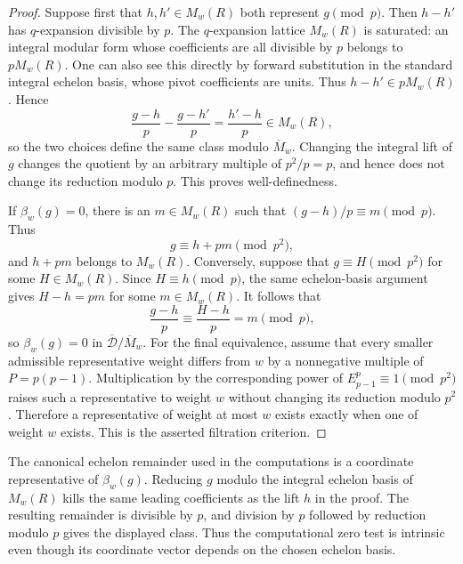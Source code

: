 \begin{proof}
Suppose first that $h,h'\in M_w(R)$ both represent $g\pmod p$.  Then
$h-h'$ has $q$-expansion divisible by $p$.  The $q$-expansion lattice
$M_w(R)$ is saturated: an integral modular form whose coefficients are all
divisible by $p$ belongs to $pM_w(R)$.  One can also see this directly by
forward substitution in the standard integral echelon basis, whose pivot
coefficients are units.  Thus $h-h'\in pM_w(R)$.  Hence
\[
  \frac{g-h}{p}-\frac{g-h'}{p}=\frac{h'-h}{p}\in M_w(R),
\]
so the two choices define the same class modulo $\overline M_w$.  Changing
the integral lift of $g$ changes the quotient by an arbitrary multiple of
$p^2/p=p$, and hence does not change its reduction modulo $p$.  This proves
well-definedness.

If $\beta_w(g)=0$, there is an $m\in M_w(R)$ such that
$(g-h)/p\equiv m\pmod p$.  Thus
\[
  g\equiv h+pm\pmod{p^2},
\]
and $h+pm$ belongs to $M_w(R)$.  Conversely, suppose that
$g\equiv H\pmod{p^2}$ for some $H\in M_w(R)$.  Since
$H\equiv h\pmod p$, the same echelon-basis argument gives
$H-h=pm$ for some $m\in M_w(R)$.  It follows that
\[
  \frac{g-h}{p}\equiv\frac{H-h}{p}=m\pmod p,
\]
so $\beta_w(g)=0$ in
$\overline{\mathcal D}/\overline M_w$.  For the final equivalence, assume
that every smaller admissible representative weight differs from $w$ by a
nonnegative multiple of $P=p(p-1)$.  Multiplication by the corresponding
power of $E_{p-1}^p\equiv1\pmod {p^2}$ raises such a representative to
weight $w$ without changing its reduction modulo $p^2$.  Therefore a
representative of weight at most $w$ exists exactly when one of weight $w$
exists.  This is the asserted filtration criterion.
\end{proof}

\begin{remark}\label{rem:bockstein-computation}
The canonical echelon remainder used in the computations is a coordinate
representative of $\beta_w(g)$.  Reducing $g$ modulo the integral echelon
basis of $M_w(R)$ kills the same leading coefficients as the lift $h$ in
the proof.  The resulting remainder is divisible by $p$, and division by
$p$ followed by reduction modulo $p$ gives the displayed class.  Thus the
computational zero test is intrinsic even though its coordinate vector
depends on the chosen echelon basis.
\end{remark}
